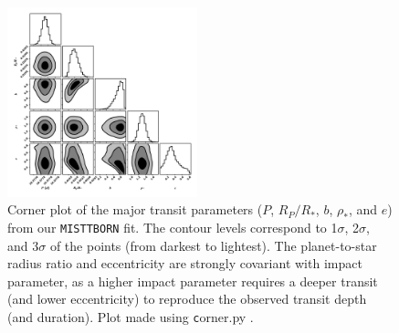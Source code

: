 \documentclass[twocolumn]{aastex631}
\begin{document}
\begin{figure}[tb]
    \centering
    \includegraphics[width=0.49\textwidth]{KOI3876_corner1_3sig.pdf}
    \caption{Corner plot of the major transit parameters ($P$, $R_P/R_*$, $b$, $\rho_*$, and $e$) from our \texttt{MISTTBORN} fit. The contour levels correspond to 1$\sigma$, 2$\sigma$, and 3$\sigma$ of the points (from darkest to lightest). The planet-to-star radius ratio and eccentricity are strongly covariant with impact parameter, as a higher impact parameter requires a deeper transit (and lower eccentricity) to reproduce the observed transit depth (and duration). Plot made using {\texttt corner.py} \citep{foreman2016corner}.}
    \label{fig:ecccorner}
\end{figure} 
\end{document}
